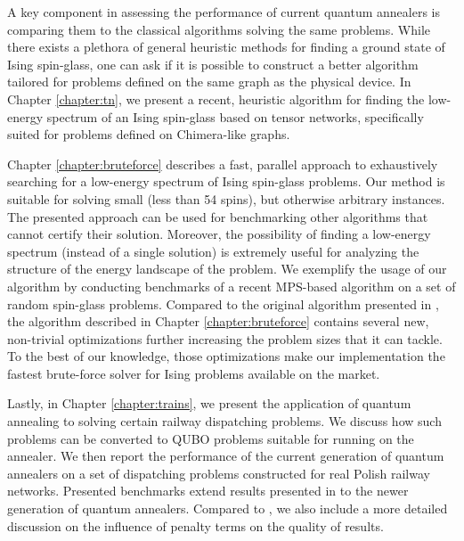 A key component in assessing the performance of current quantum annealers is
comparing them to the classical algorithms solving the same problems. While
there exists a plethora of general heuristic methods for finding a ground state
of Ising spin-glass, one can ask if it is possible to construct a better
algorithm tailored for problems defined on the same graph as the physical
device. In Chapter \ref{chapter:tn}, we present a recent, heuristic algorithm
for finding the low-energy spectrum of an Ising spin-glass based on tensor
networks, specifically suited for problems defined on Chimera-like graphs.

Chapter \ref{chapter:bruteforce} describes a fast, parallel approach to
exhaustively searching for a low-energy spectrum of Ising spin-glass problems.
Our method is suitable for solving small (less than 54 spins), but otherwise
arbitrary instances. The presented approach can be used for benchmarking other
algorithms that cannot certify their solution. Moreover, the possibility of
finding a low-energy spectrum (instead of a single solution) is extremely
useful for analyzing the structure of the energy landscape of the problem. We
exemplify the usage of our algorithm by conducting benchmarks of a recent
MPS-based algorithm on a set of random spin-glass problems. Compared to the
original algorithm presented in \cite{bruteforce}, the algorithm described in
Chapter \ref{chapter:bruteforce} contains several new, non-trivial
optimizations further increasing the problem sizes that it can tackle. To the
best of our knowledge, those optimizations make our implementation the fastest
brute-force solver for Ising problems available on the market.

Lastly, in Chapter \ref{chapter:trains}, we present the application of quantum
annealing to solving certain railway dispatching problems. We discuss how such
problems can be converted to QUBO problems suitable for running on the
annealer. We then report the performance of the current generation of quantum
annealers on a set of dispatching problems constructed for real Polish railway
networks. Presented benchmarks extend results presented in
\cite{railwaydispatching} to the newer generation of quantum annealers.
Compared to \cite{railwaydispatching}, we also include a more detailed
discussion on the influence of penalty terms on the quality of results.
